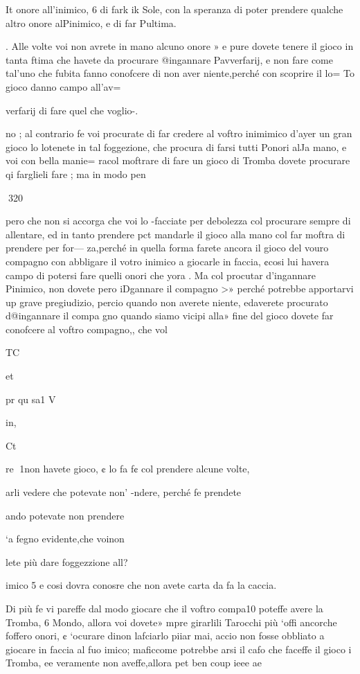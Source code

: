 \documentclass[12pt,a6paper]{article}
\begin{document}
It
onore all'inimico, 6 di fark ik
Sole, con la speranza di poter
prendere qualche altro onore
alPinimico, e di far Pultima.

. Alle volte voi non avrete
in mano alcuno onore » e pure
dovete tenere il gioco in tanta
ftima che havete da procurare
@ingannare Pavverfarij, e non
fare come tal’uno che fubita
fanno conofcere di non aver
niente,perché con scoprire il lo=
To gioco danno campo all’av=

verfarij di fare quel che voglio-.

no ; al contrario fe voi procurate di far credere al voftro inimimico d’ayer un gran gioco lo
lotenete in tal foggezione, che
procura di farsi tutti Ponori alJa mano, e voi con bella manie=
racol moftrare di fare un gioco di Tromba dovete procurare
qi farglieli fare ; ma in modo
pen

 
320

pero che non si accorga che voi
lo -facciate per debolezza col
procurare sempre di allentare, ed in tanto prendere pct
mandarle il gioco alla mano col
far moftra di prendere per for—
za,perché in quella forma farete ancora il gioco del vouro
compagno con abbligare il votro inimico a giocarle in faccia, ¢cosi lui havera campo di
potersi fare quelli onori che
yora .
Ma col procutar d’ingannare
Pinimico, non dovete pero iDgannare il compagno >» perché
potrebbe apportarvi up grave
pregiudizio, percio quando non
averete niente, edaverete procurato d@ingannare il compa
gno quando siamo vicipi alla»
fine del gioco dovete far conofcere al voftro compagno,, che
vol

 

TC

et

pr
qu
sa1
V

in,

Ct

re
1non havete gioco, ¢ lo fa
f¢ col prendere alcune volte,

arli vedere che potevate non’
-ndere, perché fe prendete

ando potevate non prendere

‘a fegno evidente,che voinon

lete più dare foggezzione all?

imico 5 e cosi dovra conosre che non avete carta da fa
la caccia.

Di più fe vi pareffe dal modo
giocare che il voftro compa10 poteffe avere la Tromba, 6
Mondo, allora voi dovete»
mpre girarlili Tarocchi più
‘offi ancorche foffero onori, ¢
‘ocurare dinon lafciarlo piiar mai, accio non fosse obbliato a giocare in faccia al fuo
imico; maficcome potrebbe
arsi il cafo che faceffe il gioco
i Tromba, ee veramente non
aveffe,allora pet ben coup ieee
ae
\end{document}
